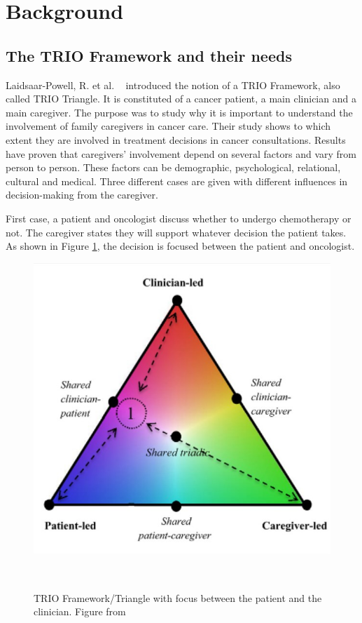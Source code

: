 \documentclass{sigchi}
\begin{document}
\section{Background}

\subsection{The TRIO Framework and their needs}

Laidsaar-Powell, R. et al. ~\cite{Laidsaar-Powell2017} introduced the notion of a TRIO Framework, also called TRIO Triangle. It is constituted of a cancer patient, a main clinician and a main caregiver. The purpose was to study why it is important to understand the involvement of family caregivers in cancer care. Their study shows to which extent they are involved in treatment decisions in cancer consultations. Results have proven that caregivers’ involvement depend on several factors and vary from person to person. These factors can be demographic, psychological, relational, cultural and medical. Three different cases are given with different influences in decision-making from the caregiver.

First case, a patient and oncologist discuss whether to undergo chemotherapy or not. The caregiver states they will support whatever decision the patient takes. As shown in Figure \ref{fig:PatientClinicianFocus}, the decision is focused between the patient and oncologist.

\begin{figure}[H]
\centering
  \includegraphics[width=0.9\columnwidth]{figures/Triangle1Screenshot.jpg}
  \caption{TRIO Framework/Triangle with focus between the patient and the clinician. Figure from}~\label{fig:PatientClinicianFocus}
\end{figure}
\end{document}
